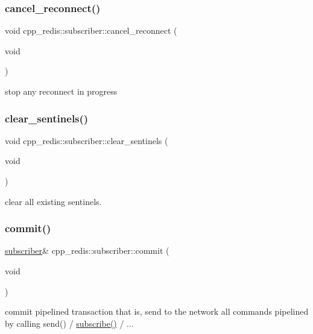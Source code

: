 \subsubsection{\texorpdfstring{cancel\+\_\+reconnect()}{cancel\_reconnect()}}
{\footnotesize\ttfamily void cpp\+\_\+redis\+::subscriber\+::cancel\+\_\+reconnect (\begin{DoxyParamCaption}\item[{void}]{ }\end{DoxyParamCaption})}

stop any reconnect in progress \mbox{\label{classcpp__redis_1_1subscriber_ac8f371c14866842cdda7cf1ee5eee2b8}} 
\subsubsection{\texorpdfstring{clear\+\_\+sentinels()}{clear\_sentinels()}}
{\footnotesize\ttfamily void cpp\+\_\+redis\+::subscriber\+::clear\+\_\+sentinels (\begin{DoxyParamCaption}\item[{void}]{ }\end{DoxyParamCaption})}

clear all existing sentinels. \mbox{\label{classcpp__redis_1_1subscriber_abbf600802ed93b82323185eec5719ecb}} 
\subsubsection{\texorpdfstring{commit()}{commit()}}
{\footnotesize\ttfamily \hyperlink{classcpp__redis_1_1subscriber}{subscriber}\& cpp\+\_\+redis\+::subscriber\+::commit (\begin{DoxyParamCaption}\item[{void}]{ }\end{DoxyParamCaption})}

commit pipelined transaction that is, send to the network all commands pipelined by calling send() / \hyperlink{classcpp__redis_1_1subscriber_afee579c702182041645a3d3c55de4b9e}{subscribe()} / ...

